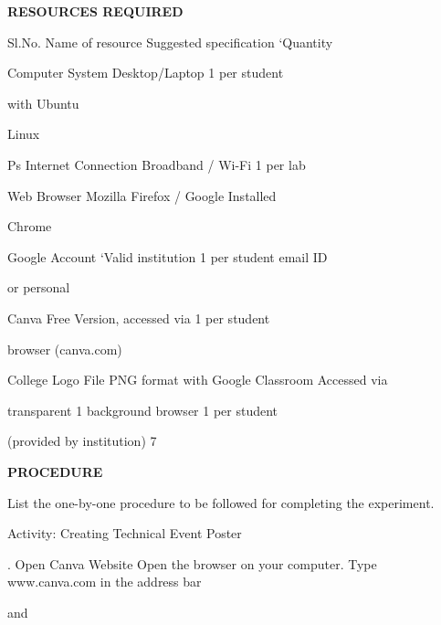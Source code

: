 \documentclass[10pt,a4paper]{article}
\begin{document}
\medskip\noindent\textbf{RESOURCES REQUIRED}\par
\noindent Sl.No.                                                   Name of resource Suggested specification ‘Quantity\par

                                      Computer System Desktop/Laptop      1 per student\par
\noindent with Ubuntu\par

\noindent Linux\par
\noindent Ps Internet Connection Broadband / Wi-Fi 1 per lab\par
{} Web Browser Mozilla Firefox / Google Installed\par
\noindent Chrome\par

                                      Google Account ‘Valid institution   1 per student email ID\par
\noindent or personal\par

 Canva Free Version, accessed via 1 per student\par
\noindent browser (canva.com)\par

                                      College Logo File PNG format with   Google Classroom Accessed via\par
\noindent transparent 1 background            browser 1 per student\par
\noindent (provided by institution) 7\par

\medskip\noindent\textbf{PROCEDURE}\par
\noindent List the one-by-one procedure to be followed for completing the experiment.\par
\noindent Activity: Creating Technical Event Poster\par
{}. Open Canva Website Open the browser on your computer. Type www.canva.com in the address bar\par
\noindent and\par
\end{document}
